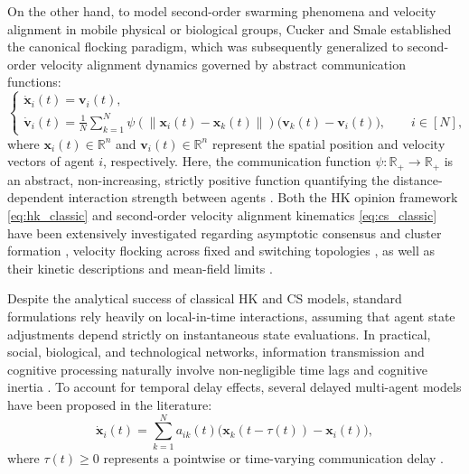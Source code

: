 \documentclass[11pt]{amsart}
\numberwithin{equation}{section}
\begin{document}
On the other hand, to model second-order swarming phenomena and velocity alignment in mobile physical or biological groups, Cucker and Smale \cite{Cucker2007} established the canonical flocking paradigm, which was subsequently generalized to second-order velocity alignment dynamics governed by abstract communication functions:
\begin{equation}\label{eq:cs_classic}
\begin{cases}
\dot{\boldsymbol{x}}_i(t) = \boldsymbol{v}_i(t), \\[4pt]
\dot{\boldsymbol{v}}_i(t) = \displaystyle\frac{1}{N} \sum_{k=1}^{N} \psi(\|\boldsymbol{x}_i(t) - \boldsymbol{x}_k(t)\|)\bigl(\boldsymbol{v}_k(t) - \boldsymbol{v}_i(t)\bigr), \qquad i \in [N],
\end{cases}
\end{equation}
where $\boldsymbol{x}_i(t) \in \mathbb{R}^n$ and $\boldsymbol{v}_i(t) \in \mathbb{R}^n$ represent the spatial position and velocity vectors of agent $i$, respectively. Here, the communication function $\psi : \mathbb{R}_+ \to \mathbb{R}_+$ is an abstract, non-increasing, strictly positive function quantifying the distance-dependent interaction strength between agents \cite{Ha2009}. Both the HK opinion framework \eqref{eq:hk_classic} and second-order velocity alignment kinematics \eqref{eq:cs_classic} have been extensively investigated regarding asymptotic consensus and cluster formation \cite{Choi2021, Jabin2014}, velocity flocking across fixed and switching topologies \cite{Dong, Fanqin}, as well as their kinetic descriptions and mean-field limits \cite{Carrillo2010, Ha2009, Ha2}.

Despite the analytical success of classical HK and CS models, standard formulations rely heavily on local-in-time interactions, assuming that agent state adjustments depend strictly on instantaneous state evaluations. In practical, social, biological, and technological networks, information transmission and cognitive processing naturally involve non-negligible time lags and cognitive inertia \cite{Chiara, Choi2021, Continelli, Continelli2023, Du2025, Haskovec2021, Pignotti2018, Cartabia}. To account for temporal delay effects, several delayed multi-agent models have been proposed in the literature:
\begin{equation*}\label{eq:hk_delay}
\dot{\boldsymbol{x}}_i(t) = \sum_{k=1}^{N} a_{ik}(t)\bigl(\boldsymbol{x}_k(t - \tau(t)) - \boldsymbol{x}_i(t)\bigr),
\end{equation*}
where $\tau(t) \ge 0$ represents a pointwise or time-varying communication delay \cite{Choi2021, Continelli2023}.
\end{document}
